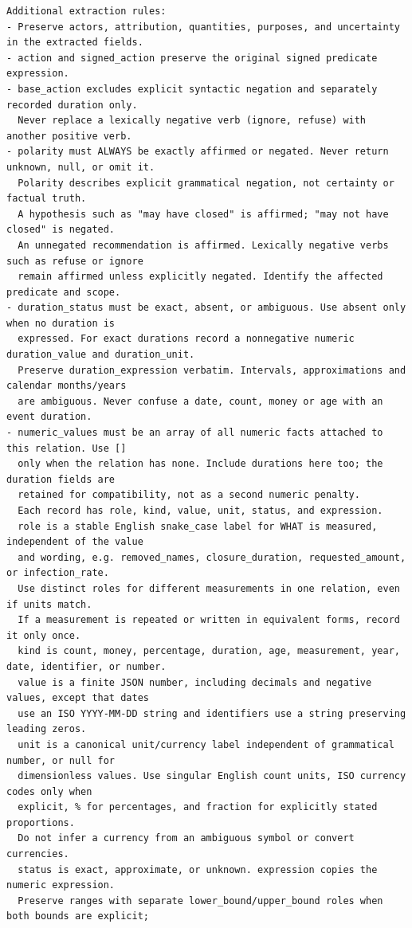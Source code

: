 \begin{lstlisting}[title={Mensagem de extração estrutural}]
Additional extraction rules:
- Preserve actors, attribution, quantities, purposes, and uncertainty in the extracted fields.
- action and signed_action preserve the original signed predicate expression.
- base_action excludes explicit syntactic negation and separately recorded duration only.
  Never replace a lexically negative verb (ignore, refuse) with another positive verb.
- polarity must ALWAYS be exactly affirmed or negated. Never return unknown, null, or omit it.
  Polarity describes explicit grammatical negation, not certainty or factual truth.
  A hypothesis such as "may have closed" is affirmed; "may not have closed" is negated.
  An unnegated recommendation is affirmed. Lexically negative verbs such as refuse or ignore
  remain affirmed unless explicitly negated. Identify the affected predicate and scope.
- duration_status must be exact, absent, or ambiguous. Use absent only when no duration is
  expressed. For exact durations record a nonnegative numeric duration_value and duration_unit.
  Preserve duration_expression verbatim. Intervals, approximations and calendar months/years
  are ambiguous. Never confuse a date, count, money or age with an event duration.
- numeric_values must be an array of all numeric facts attached to this relation. Use []
  only when the relation has none. Include durations here too; the duration fields are
  retained for compatibility, not as a second numeric penalty.
  Each record has role, kind, value, unit, status, and expression.
  role is a stable English snake_case label for WHAT is measured, independent of the value
  and wording, e.g. removed_names, closure_duration, requested_amount, or infection_rate.
  Use distinct roles for different measurements in one relation, even if units match.
  If a measurement is repeated or written in equivalent forms, record it only once.
  kind is count, money, percentage, duration, age, measurement, year, date, identifier, or number.
  value is a finite JSON number, including decimals and negative values, except that dates
  use an ISO YYYY-MM-DD string and identifiers use a string preserving leading zeros.
  unit is a canonical unit/currency label independent of grammatical number, or null for
  dimensionless values. Use singular English count units, ISO currency codes only when
  explicit, % for percentages, and fraction for explicitly stated proportions.
  Do not infer a currency from an ambiguous symbol or convert currencies.
  status is exact, approximate, or unknown. expression copies the numeric expression.
  Preserve ranges with separate lower_bound/upper_bound roles when both bounds are explicit;

\end{lstlisting}
